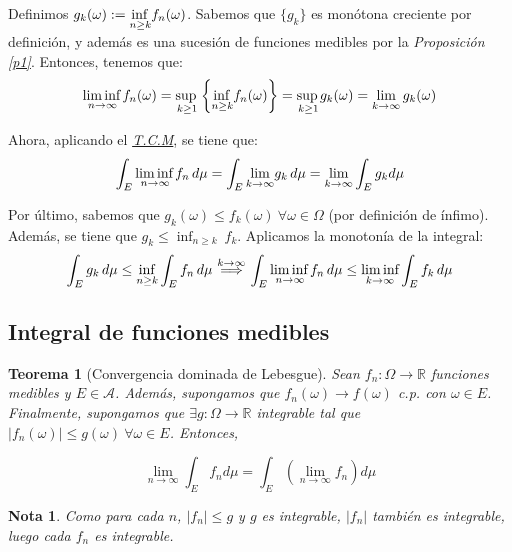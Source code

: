 \documentclass[11pt, a4paper]{article}
\makeatletter
\newif\IfInSansMode
\let\oldsf\sffamily
\renewcommand*{\sffamily}{\oldsf\mathversion{sans}\InSansModetrue}
\let\oldnorm\normalfont
\renewcommand*{\normalfont}{\oldnorm\InSansModefalse\mathversion{normal}}
\newcommand{\R}{\mathbb{R}} \newcommand{\N}{\mathbb{N}}
\newcommand{\w}{\omega}
\renewenvironment{proof}[1][\proofname] {\par\pushQED{\qed}\normalfont\topsep6\p@\@plus6\p@\relax\trivlist\item[\hskip\labelsep\itshape\sffamily#1\@addpunct{.}]\ignorespaces}{\popQED\endtrivlist\@endpefalse}
\theoremstyle{theorem-style}
\newtheorem{nth}{Teorema}[section]
\theoremstyle{definition-style}
\theoremstyle{remark-style}
\newtheorem*{nota}{Nota}
\theoremstyle{example-style}
\makeatother
\begin{document}
  \begin{proof} Definimos $g_k(\omega) :=  \underset{n\geq k}{\text{inf\,} } f_n(\omega )$. Sabemos que $\{g_k\}$ es monótona creciente por definición, y además es una sucesión de funciones medibles por la \textit{Proposición \ref{p1}}. Entonces, tenemos que: $$\underset{n\to \infty}{\text{lim\,inf\,}} f_n (\omega ) = \underset{k\geq 1}{\text{sup\,}}  \left\{ \underset{n\geq k}{\text{inf\,} } f_n(\omega )\right\}  =  \underset{k\geq 1}{\text{sup\,}} g_k(\omega) = \lim_{k\to\infty} g_k(\w)$$ 
  
Ahora, aplicando el \hyperref[tcm]{\textit{T.C.M}}, se tiene que:
\[
\int_E \underset{n\to \infty}{\text{lim\,inf\,}} f_n\, d\mu  =  \int_E \underset{k\to \infty}{\text{lim}} g_k\, d\mu 
 =  \underset{k\to \infty}{\text{lim}}  \int_E g_k d\mu 
\]

Por último, sabemos que $g_k(\omega)\leq f_k(\omega) \ \forall \omega\in \Omega $ (por definición de ínfimo). Además, se tiene que $g_k \le \inf_{n\ge k}\ f_k$. Aplicamos la monotonía de la integral:
\[
\int_E g_k\, d\mu  \leq \inf_{n\ge k} \int_E f_n\, d\mu 
\overset{k\to\infty}{\implies}
\int_E \underset{n\to \infty}{\text{lim\,inf\,}} f_n\, d\mu 
\leq   \underset{k\to \infty}{\lim \text{inf}} \int_E f_k\, d\mu
\]
\end{proof}

\subsection{Integral de funciones medibles}



\begin{nth}[Convergencia dominada de Lebesgue]
  Sean $f_n : \Omega \rightarrow \R$ funciones medibles y $E \in \mathscr A$. Además, supongamos que ${f_n(\omega)} \rightarrow f(\omega)$ c.p. con $\omega \in E$. Finalmente, supongamos que $\exists g: \Omega \rightarrow \R$ integrable tal que $|f_n(\omega)| \leq g(\omega) \ \forall \omega \in E$. Entonces,
  
  $$ \lim_{n \to \infty} \int_E f_n d \mu = \int_E  \left( \lim_{n \to \infty} f_n \right) d \mu$$ 
\end{nth}

\begin{nota}
  Como para cada $n$, $|f_n| \leq g$ y $g$ es integrable, $|f_n|$ también es integrable, luego cada $f_n$ es integrable.
\end{nota}
\end{document}
